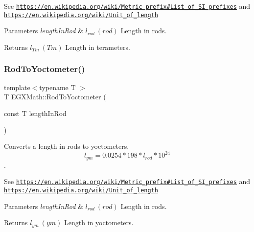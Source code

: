 See \href{https://en.wikipedia.org/wiki/Metric_prefix#List_of_SI_prefixes}{\tt https\+://en.\+wikipedia.\+org/wiki/\+Metric\+\_\+prefix\#\+List\+\_\+of\+\_\+\+S\+I\+\_\+prefixes} and \href{https://en.wikipedia.org/wiki/Unit_of_length}{\tt https\+://en.\+wikipedia.\+org/wiki/\+Unit\+\_\+of\+\_\+length} 
\begin{DoxyParams}{Parameters}
{\em length\+In\+Rod} & $ l_{rod}\ (rod)$ Length in rods. \\
\hline
\end{DoxyParams}
\begin{DoxyReturn}{Returns}
$ l_{Tm}\ (Tm)$ Length in terameters. 
\end{DoxyReturn}
\mbox{\label{group___e_g_x_math-_conversions-_length_conversions-_surveyors-_rod-_s_i_ga8ed4c9bfa230e77380ff81ff9ed59a6e}} 
\subsubsection{\texorpdfstring{Rod\+To\+Yoctometer()}{RodToYoctometer()}}
{\footnotesize\ttfamily template$<$typename T $>$ \\
T E\+G\+X\+Math\+::\+Rod\+To\+Yoctometer (\begin{DoxyParamCaption}\item[{const T}]{length\+In\+Rod }\end{DoxyParamCaption})}



Converts a length in rods to yoctometers. \[ l_{ym}=0.0254 * 198 * l_{rod} * 10^{24} \]. 

See \href{https://en.wikipedia.org/wiki/Metric_prefix#List_of_SI_prefixes}{\tt https\+://en.\+wikipedia.\+org/wiki/\+Metric\+\_\+prefix\#\+List\+\_\+of\+\_\+\+S\+I\+\_\+prefixes} and \href{https://en.wikipedia.org/wiki/Unit_of_length}{\tt https\+://en.\+wikipedia.\+org/wiki/\+Unit\+\_\+of\+\_\+length} 
\begin{DoxyParams}{Parameters}
{\em length\+In\+Rod} & $ l_{rod}\ (rod)$ Length in rods. \\
\hline
\end{DoxyParams}
\begin{DoxyReturn}{Returns}
$ l_{ym}\ (ym)$ Length in yoctometers. 
\end{DoxyReturn}
\mbox{\label{group___e_g_x_math-_conversions-_length_conversions-_surveyors-_rod-_s_i_ga0e3f1a816c8a67c7825b3b82ecf54b26}} 
